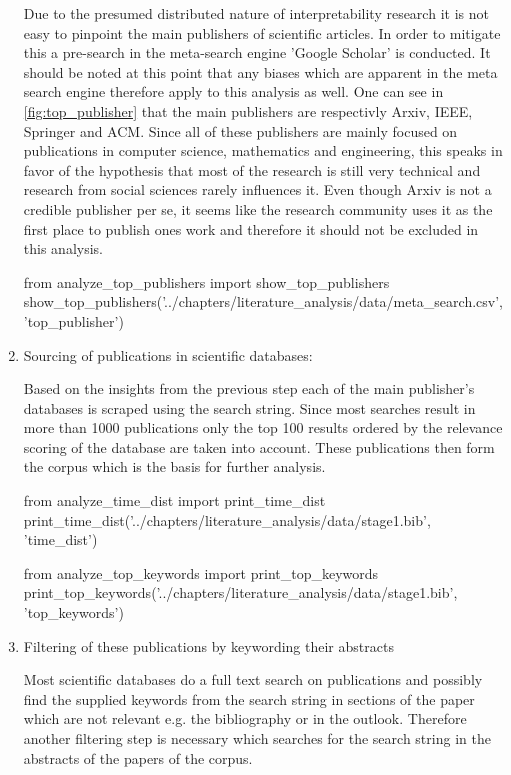 \begin{enumerate}
	Due to the presumed distributed nature of interpretability research it is not easy to pinpoint the main publishers of scientific articles. In order to mitigate this a pre-search in the meta-search engine 'Google Scholar' is conducted. It should be noted at this point that any biases which are apparent in the meta search engine therefore apply to this analysis as well. One can see in \autoref{fig:top_publisher} that the main publishers are respectivly Arxiv, IEEE, Springer and ACM. Since all of these publishers are mainly focused on publications in computer science, mathematics and engineering, this speaks in favor of the hypothesis that most of the research is still very technical and research from social sciences rarely influences it. Even though Arxiv is not a credible publisher per se, it seems like the research community uses it as the first place to publish ones work and therefore it should not be excluded in this analysis. 
	
\begin{pycode}
from analyze_top_publishers import show_top_publishers
show_top_publishers('../chapters/literature_analysis/data/meta_search.csv', 'top_publisher')
\end{pycode}

	\item Sourcing of publications in scientific databases:
	
	Based on the insights from the previous step each of the main publisher's databases is scraped using the search string. Since most searches result in more than 1000 publications only the top 100 results ordered by the relevance scoring of the database are taken into account. These publications then form the corpus which is the basis for further analysis.

\begin{pycode}
from analyze_time_dist import print_time_dist
print_time_dist('../chapters/literature_analysis/data/stage1.bib', 'time_dist')
\end{pycode}

\begin{pycode}
from analyze_top_keywords import print_top_keywords
print_top_keywords('../chapters/literature_analysis/data/stage1.bib', 'top_keywords')
\end{pycode}
	
	\item Filtering of these publications by keywording their abstracts
	
	Most scientific databases do a full text search on publications and possibly find the supplied keywords from the search string in sections of the paper which are not relevant e.g. the bibliography or in the outlook. Therefore another filtering step is necessary which searches for the search string in the abstracts of the papers of the corpus.
	

\end{enumerate}

